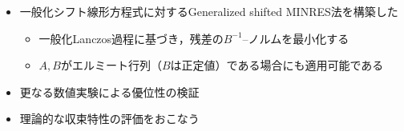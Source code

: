 
\begin{itemize}
	\item 一般化シフト線形方程式に対するGeneralized shifted MINRES法を構築した
		\begin{itemize}
			\item 一般化Lanczos過程に基づき，残差の$B^{-1}$--ノルムを最小化する
			\item $A, B$がエルミート行列（$B$は正定値）である場合にも適用可能である
		\end{itemize}
	\item 更なる数値実験による優位性の検証
	\item 理論的な収束特性の評価をおこなう
\end{itemize}